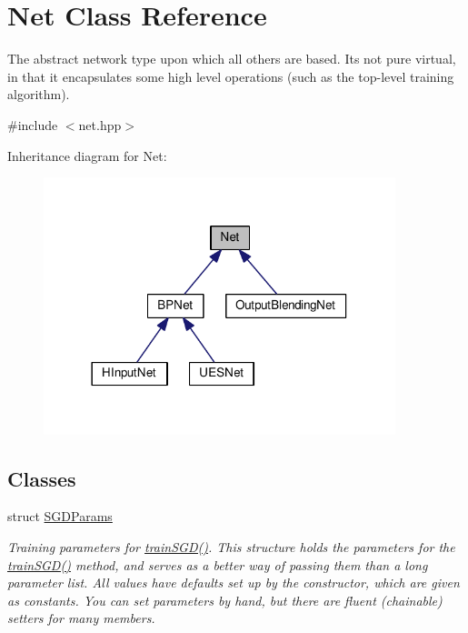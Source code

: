 \hypertarget{classNet}{}\section{Net Class Reference}
\label{classNet}


The abstract network type upon which all others are based. It\textquotesingle{}s not pure virtual, in that it encapsulates some high level operations (such as the top-\/level training algorithm).  




{\ttfamily \#include $<$net.\+hpp$>$}



Inheritance diagram for Net\+:
\nopagebreak
\begin{figure}[H]
\begin{center}
\leavevmode
\includegraphics[width=290pt]{classNet__inherit__graph}
\end{center}
\end{figure}
\subsection*{Classes}
\begin{DoxyCompactItemize}
\item 
struct \hyperlink{structNet_1_1SGDParams}{S\+G\+D\+Params}
\begin{DoxyCompactList}\small\item\em Training parameters for \hyperlink{classNet_a4e527a7773eed5fb071b78ef3a636c95}{train\+S\+G\+D()}. This structure holds the parameters for the \hyperlink{classNet_a4e527a7773eed5fb071b78ef3a636c95}{train\+S\+G\+D()} method, and serves as a better way of passing them than a long parameter list. All values have defaults set up by the constructor, which are given as constants. You can set parameters by hand, but there are fluent (chainable) setters for many members. \end{DoxyCompactList}\end{DoxyCompactItemize}
